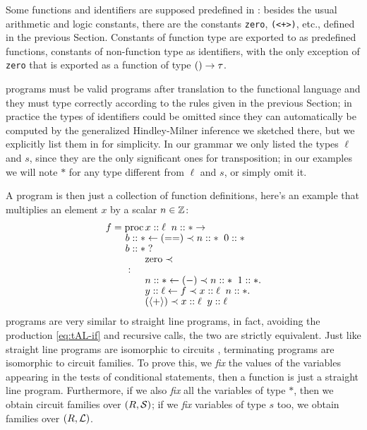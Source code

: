 Some functions and identifiers are supposed predefined in \tAL{}:
besides the usual arithmetic and logic constants, there are the
constants \lstinline{zero}, \lstinline{(<+>)}, etc., defined in the
previous Section. Constants of function type are exported to \tAL{} as
predefined functions, constants of non-function type as identifiers,
with the only exception of \lstinline{zero} that is exported as a
function of type $()\rightarrow\tau$.

\tAL{} programs must be valid programs after translation to the
functional language and they must type correctly according to the
rules given in the previous Section; in practice the types of
identifiers could be omitted since they can automatically be computed
by the generalized Hindley-Milner inference we sketched there, but we
explicitly list them in \tAL{} for simplicity. In our grammar we only
listed the types $\ell$ and $s$, since they are the only significant
ones for transposition; in our examples we will note $\ast$ for any
type different from $\ell$ and $s$, or simply omit it.

A \tAL{} program is then just a collection of function definitions,
here's an example that multiplies an element $x$ by a scalar $n\in\mathbb{Z}$:
\begin{equation}
  \label{eq:tALprog}
  \begin{aligned}
    &f = \operatorname{proc} x::\ell \;\; n::\ast \rightarrow\\[-1ex]
    &\qquad b::\ast \leftarrow (==) \prec n::\ast \;\; 0::\ast\\[-1ex]
    &\qquad b::\ast \;?\\[-1ex]
    &\qquad\qquad \text{zero} \prec\\[-1ex]
    &\qquad :\\[-1ex]
    &\qquad\qquad n::\ast \leftarrow (-) \prec n::\ast \;\; 1::\ast.\\[-1ex]
    &\qquad\qquad y::\ell \leftarrow f \prec x::\ell \;\; n::\ast.\\[-1ex]
    &\qquad\qquad (\langle+\rangle) \prec x::\ell \;\; y::\ell\\[-1ex]
  \end{aligned}
\end{equation}

\tAL{} programs are very similar to straight line programs, in fact,
avoiding the production \eqref{eq:tAL-if} and recursive calls, the two
are strictly equivalent. Just like straight line programs are
isomorphic to circuits \cite[Lemma 13.17]{BuClSh}, terminating \tAL{}
programs are isomorphic to circuit families. To prove this, we
\emph{fix} the values of the variables appearing in the tests of
conditional statements, then a \tAL{} function is just a straight line
program. Furthermore, if we also \emph{fix} all the variables of type
$*$, then we obtain circuit families over $(R,\mathcal{S})$; if we
\emph{fix} variables of type $s$ too, we obtain families over
$(R,\mathcal{L})$.

